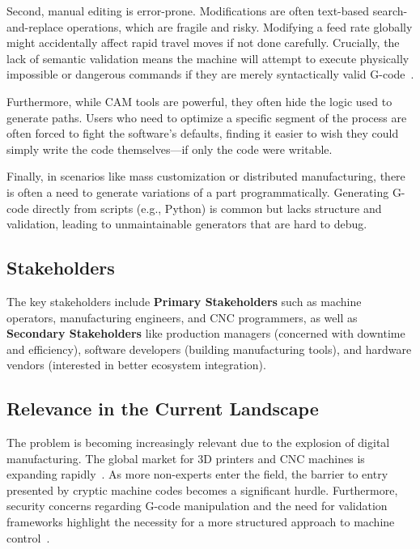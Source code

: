 Second, manual editing is error-prone. Modifications are often text-based search-and-replace operations, which are fragile and risky. Modifying a feed rate globally might accidentally affect rapid travel moves if not done carefully. Crucially, the lack of semantic validation means the machine will attempt to execute physically impossible or dangerous commands if they are merely syntactically valid G-code~\cite{staggs_manipulation_2022}.

Furthermore, while CAM tools are powerful, they often hide the logic used to generate paths. Users who need to optimize a specific segment of the process are often forced to fight the software's defaults, finding it easier to wish they could simply write the code themselves—if only the code were writable.

Finally, in scenarios like mass customization or distributed manufacturing, there is often a need to generate variations of a part programmatically. Generating G-code directly from scripts (e.g., Python) is common but lacks structure and validation, leading to unmaintainable generators that are hard to debug.

\subsection{Stakeholders}

The key stakeholders include \textbf{Primary Stakeholders} such as machine operators, manufacturing engineers, and CNC programmers, as well as \textbf{Secondary Stakeholders} like production managers (concerned with downtime and efficiency), software developers (building manufacturing tools), and hardware vendors (interested in better ecosystem integration).

\subsection{Relevance in the Current Landscape}

The problem is becoming increasingly relevant due to the explosion of digital manufacturing. The global market for 3D printers and CNC machines is expanding rapidly~\cite{noauthor_global_nodate}. As more non-experts enter the field, the barrier to entry presented by cryptic machine codes becomes a significant hurdle. Furthermore, security concerns regarding G-code manipulation and the need for validation frameworks highlight the necessity for a more structured approach to machine control~\cite{noauthor_machine_2025, staggs_manipulation_2022}.

